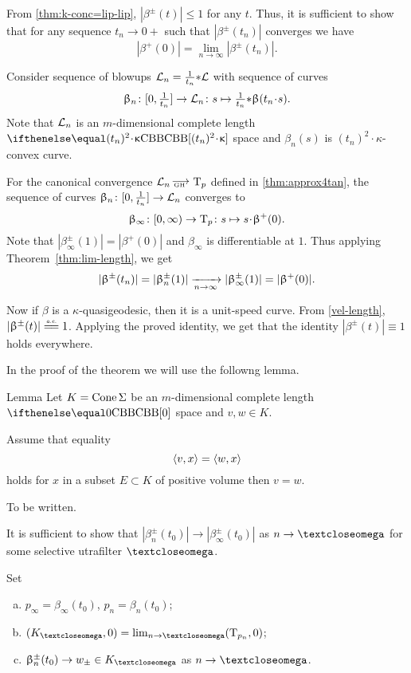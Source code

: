 From \ref{thm:k-conc=lip-lip}, $|\beta^\pm(t)|\le 1$ for any $t$. 
Thus, it is sufficient to show that for any sequence $t_n\to0+$ such that $|\beta^\pm(t_n)|$ converges we have 
$$|\beta^+(0)|=\lim_{n\to\infty}|\beta^\pm(t_n)|.$$

Consider sequence of blowups $\mathcal{L}_n=\frac{1}{t_n}{*} \mathcal{L}$ with sequence of 
curves 
$$\beta_n\:[0,\tfrac1{t_n}]\to \spc{L}_n\:s\z\mapsto\tfrac{1}{t_n}\blow \beta(t_n\cdot s).$$
Note that $\mathcal{L}_n$  is an $m$-dimensional complete length $\Alex{(t_n)^2\cdot\kappa}$ space
and $\beta_n(s)$ is $(t_n)^2\cdot\kappa$-convex curve. 

For the canonical convergence $\spc{L}_n\GHto \T_p$ defined in \ref{thm:approx4tan},
the sequence of curves $\beta_n\:[0,\tfrac1{t_n}]\to \spc{L}_n$ converges to 
$$\beta_\infty\:[0,\infty)\to\T_p\:s\mapsto
s\cdot \beta^+(0).
$$
Note that $|\beta_\infty^\pm(1)|=|\beta^+(0)|$ and $\beta_\infty$ is differentiable at $1$.
Thus applying Theorem~\ref{thm:lim-length}, 
we get 
\[|\beta^\pm(t_n)|
=
|\beta_n^\pm(1)|
\xto[n\to\infty]{}
|\beta^\pm_\infty(1)|
=
|\beta^+(0)|.
\]

Now if $\beta$ is a $\kappa$-quasigeodesic, then it is a unit-speed curve.
From \ref{vel-length}, $|\beta^\pm(t)|\ae 1$.
Applying the proved identity, we get that the identity $|\beta^\pm(t)|\equiv1$ holds everywhere.
\qeds

In the proof of the theorem we will use the followng lemma.


\begin{thm}{Lemma}\label{lem:<x,v>=<x,w> => v=w}
Let $K=\mathop{\rm Cone}\nolimits\Sigma$ be an $m$-dimensional complete length $\Alex0$ space and $v,w\in K$.

Assume that equality 
\[\langle v,x\rangle=\langle w,x\rangle\]
holds for $x$ in a subset $E\subset K$ of positive volume
then $v=w$.
\end{thm}

 To be written.%
\qeds



It is sufficient to show that 
$|\beta_n^\pm(t_0)|\to |\beta_\infty^\pm(t_0)|$ as $n\to\o$
for some selective utrafilter $\o$.

Set 
\begin{enumerate}[(a)]
\item $p_\infty=\beta_\infty(t_0)$, $p_n=\beta_n(t_0)$;
\item $(K_\o,0)=\lim_{n\to\o}(\T_{p_n},0)$;
\item\label{beta->w} $\beta_n^\pm(t_0)\to w_\pm\in K_\o$ as $n\to\o$.
\end{enumerate}

